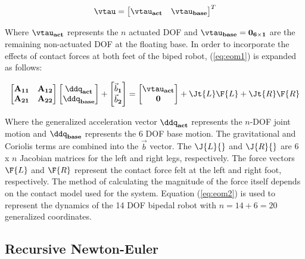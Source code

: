 \begin{equation}
	\label{eq:gentau}
	\vtau = {\begin{bmatrix} {\vtau}_{\mathbf{act}} & {\vtau}_{\mathbf{base}} \\ \end{bmatrix}}^T
\end{equation}

Where ${\vtau}_{\mathbf{act}}$ represents the $n$ actuated DOF and ${\vtau}_{\mathbf{base}} = \bf{0}_{6 \times 1} $ are the remaining non-actuated DOF at the floating base. In order to incorporate the effects of contact forces at both feet of the biped robot, (\ref{eq:eom1}) is expanded as follows: 

\begin{equation}
	\label{eq:eom2}
	\begin{bmatrix} \mathbf{A_{11}} & \mathbf{A_{12}} \\ \mathbf{A_{21}} & \mathbf{A_{22}} \end{bmatrix} 
	\begin{bmatrix} \ddq_{\mathbf{act}} \\ \ddq_{\mathbf{base}} \end{bmatrix} + 
	\begin{bmatrix} \vec{b}_{\mathbf 1} \\ \vec{b}_{\mathbf 2} \end{bmatrix} = 
	\begin{bmatrix} {\vtau}_{\mathbf{act}} \\ \mathbf{0} \end{bmatrix} + 
    \Jt{L}\F{L} + \Jt{R}\F{R}
\end{equation}

Where the generalized acceleration vector $\ddq_{\mathbf{act}}$ represents the $n$-DOF joint motion and $\ddq_{\mathbf{base}}$ represents the 6 DOF base motion. The gravitational and Coriolis terms are combined into the $\vec{b}$ vector. The $\J{L}{}$ and $\J{R}{}$ are 6 x $n$ Jacobian matrices for the left and right legs, respectively. The force vectors $\F{L}$ and $\F{R}$ represent the contact force felt at the left and right foot, respectively. The method of calculating the magnitude of the force itself depends on the contact model used for the system. Equation (\ref{eq:eom2}) is used to represent the dynamics of the 14 DOF bipedal robot with $n = 14 + 6 = 20$ generalized coordinates.

\subsection{Recursive Newton-Euler} %
\label{sec:kajita_s_matlab_toolbox}

